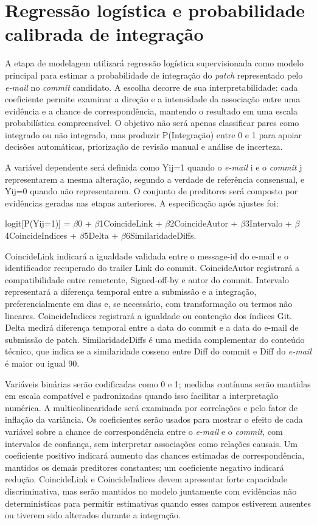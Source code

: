 \section{Regressão logística e probabilidade calibrada de integração}

A etapa de modelagem utilizará regressão logística supervisionada como modelo principal para estimar a probabilidade de integração do \textit{patch} representado pelo \textit{e-mail} no \textit{commit} candidato. A escolha decorre de sua interpretabilidade: cada coeficiente permite examinar a direção e a intensidade da associação entre uma evidência e a chance de correspondência, mantendo o resultado em uma escala probabilística compreensível. O objetivo não será apenas classificar pares como integrado ou não integrado, mas produzir P(Integração) entre 0 e 1 para apoiar decisões automáticas, priorização de revisão manual e análise de incerteza.

A variável dependente será definida como Yij=1 quando o \textit{e-mail} i e o \textit{commit} j representarem a mesma alteração, segundo a verdade de referência consensual, e Yij=0 quando não representarem. O conjunto de preditores será composto por evidências geradas nas etapas anteriores. A especificação após ajustes foi:

logit[P(Yij=1)] = $\beta$0 + $\beta$1CoincideLink + $\beta$2CoincideAutor + $\beta$3Intervalo + $\beta$4CoincideIndices + $\beta$5Delta + $\beta$6SimilaridadeDiffs.

CoincideLink indicará a igualdade validada entre o message-id do e-mail e o identificador recuperado do trailer Link do commit. CoincideAutor registrará a compatibilidade entre remetente, Signed-off-by e autor do commit. Intervalo representará a diferença temporal entre a submissão e a integração, preferencialmente em dias e, se necessário, com transformação ou termos não lineares. CoincideIndices registrará a igualdade ou contenção dos índices Git. Delta medirá diferença temporal entre a data do commit e a data do e-mail de submissão de patch. SimilaridadeDiffs é uma medida complementar do conteúdo técnico, que indica se a similaridade cosseno entre Diff do commit e Diff do \textit{e-mail} é maior ou igual 90.

Variáveis binárias serão codificadas como 0 e 1; medidas contínuas serão mantidas em escala compatível e padronizadas quando isso facilitar a interpretação numérica. A multicolinearidade será examinada por correlações e pelo fator de inflação da variância.
Os coeficientes serão usados para mostrar o efeito de cada variável sobre a chance de correspondência entre o \textit{e-mail} e o \textit{commit}, com intervalos de confiança, sem interpretar associações como relações causais. Um coeficiente positivo indicará aumento das chances estimadas de correspondência, mantidos os demais preditores constantes; um coeficiente negativo indicará redução. CoincideLink e CoincideIndices devem apresentar forte capacidade discriminativa, mas serão mantidos no modelo juntamente com evidências não determinísticas para permitir estimativas quando esses campos estiverem ausentes ou tiverem sido alterados durante a integração.


